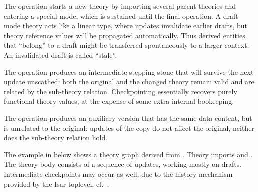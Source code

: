 \begin{isabellebody}
\begin{isamarkuptext}
  The  operation starts a new theory by importing
  several parent theories and entering a special  mode,
  which is sustained until the final  operation.  A draft
  mode theory acts like a linear type, where updates invalidate
  earlier drafts, but theory reference values will be propagated
  automatically.  Thus derived entities that ``belong'' to a draft
  might be transferred spontaneously to a larger context.  An
  invalidated draft is called ``stale''.

  The  operation produces an intermediate stepping
  stone that will survive the next update unscathed: both the original
  and the changed theory remain valid and are related by the
  sub-theory relation.  Checkpointing essentially recovers purely
  functional theory values, at the expense of some extra internal
  bookeeping.

  The  operation produces an auxiliary version that has
  the same data content, but is unrelated to the original: updates of
  the copy do not affect the original, neither does the sub-theory
  relation hold.

  \medskip The example in  below shows a theory
  graph derived from . Theory  imports
   and .  The theory body consists of a
  sequence of updates, working mostly on drafts.  Intermediate
  checkpoints may occur as well, due to the history mechanism provided
  by the Isar toplevel, cf.\ .


\end{isamarkuptext}
\end{isabellebody}
